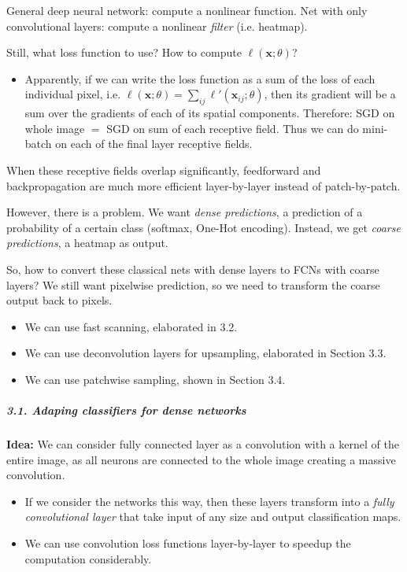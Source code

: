 \documentclass[]{article}
\let\oldsubparagraph\subparagraph
\renewcommand{\subparagraph}[1]{\oldsubparagraph{#1}\mbox{}}
\begin{document}
General deep neural network: compute a nonlinear function. Net with only
convolutional layers: compute a nonlinear \emph{filter} (i.e. heatmap).

Still, what loss function to use? How to compute
\(\ell(\mathbf x; \theta)\)?

\begin{itemize}
\item
  Apparently, if we can write the loss function as a sum of the loss of
  each individual pixel, i.e.
  \(\ell(\mathbf x; \theta) = \sum_{ij} \ell'(\mathbf x_{ij};\theta)\),
  then its gradient will be a sum over the gradients of each of its
  spatial components. Therefore: SGD on whole image \(=\) SGD on sum of
  each receptive field. Thus we can do mini-batch on each of the final
  layer receptive fields.
\end{itemize}

When these receptive fields overlap significantly, feedforward and
backpropagation are much more efficient layer-by-layer instead of
patch-by-patch.

However, there is a problem. We want \emph{dense predictions}, a
prediction of a probability of a certain class (softmax, One-Hot
encoding). Instead, we get \emph{coarse predictions}, a heatmap as
output.

So, how to convert these classical nets with dense layers to FCNs with
coarse layers? We still want pixelwise prediction, so we need to
transform the coarse output back to pixels.

\begin{itemize}
\item
  We can use fast scanning, elaborated in 3.2.
\item
  We can use deconvolution layers for upsampling, elaborated in Section
  3.3.
\item
  We can use patchwise sampling, shown in Section 3.4.
\end{itemize}

\subparagraph{3.1. Adaping classifiers for dense
networks}\label{header-n123}

\textbf{Idea:} We can consider fully connected layer as a convolution
with a kernel of the entire image, as all neurons are connected to the
whole image creating a massive convolution.

\begin{itemize}
\item
  If we consider the networks this way, then these layers transform into
  a \emph{fully convolutional layer} that take input of any size and
  output classification maps.
\item
  We can use convolution loss functions layer-by-layer to speedup the
  computation considerably.
\end{itemize}
\end{document}
